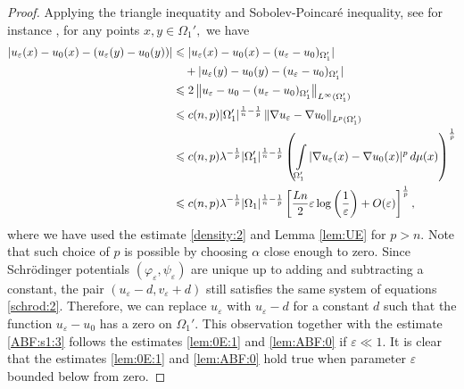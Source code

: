 \documentclass[reqno,12pt]{article}
\newcommand{\norm}[1]{\left\lVert#1\right\rVert}
\newcommand{\I}{\int\limits}
\begin{document}
\begin{proof}
    Applying the triangle inequatity and Sobolev-Poincar\'e inequality, see for instance \cite[Theorem 7.10]{GT77}, for any points $x,y\in \Omega_{1}', $ we have 
\begin{align}
    \label{ABF:s1:3}
    | u_{\varepsilon}(x)-u_0(x)-(u_{\varepsilon}(y)-u_{0}(y))|
    &\leqslant
    |u_{\varepsilon}(x)-u_0(x)-(u_{\varepsilon}-u_{0})_{\Omega_{1}'}| 
    \notag\\&\quad 
    + |u_{\varepsilon}(y)-u_{0}(y)-(u_{\varepsilon}-u_{0})_{\Omega_{1}'}|
    \notag\\
    &\leqslant
    2\norm{u_{\varepsilon}-u_{0}-(u_{\varepsilon}-u_{0})_{\Omega_{1}'}}_{L^{\infty}(\Omega_{1}')} 
    \notag\\
    &\leqslant 
    c(n,p) |\Omega_{1}'|^{\frac{1}{n}-\frac{1}{p}}\norm{\nabla u_{\varepsilon}-\nabla u_{0}}_{L^{p}(\Omega_{1}')}
    \notag \\&
    \leqslant
    c(n,p)\lambda^{-\frac{1}{p}} |\Omega_{1}'|^{\frac{1}{n}-\frac{1}{p}} \left(\I_{\Omega_{1}'} |\nabla u_{\varepsilon}(x)-\nabla u_{0}(x)|^{p}\,d\mu(x) \right)^{\frac{1}{p}}
    \notag \\&
    \leqslant
    c(n,p) \lambda^{-\frac{1}{p}} |\Omega_{1}|^{\frac{1}{n}-\frac{1}{p}} 
    \left[ \frac{Ln}{2}\varepsilon\log\left(\frac{1}{\varepsilon}\right) + O(\varepsilon) \right]^{\frac{1}{p}},
\end{align}
where we have used the estimate \eqref{density:2} and Lemma \ref{lem:UE} for $p>n$. Note that such choice of $p$ is possible by choosing $\alpha$ close enough to zero. Since Schr\"odinger potentials $(\varphi_{\varepsilon}, \psi_{\varepsilon})$ are unique up to adding and subtracting a constant, the pair $(u_{\varepsilon}-d, v_{\varepsilon}+d)$ still satisfies the same system of equations \eqref{schrod:2}. Therefore, we can replace $u_{\varepsilon}$ with $u_{\varepsilon}-d$ for a constant $d$ such that the function $u_{\varepsilon}-u_0$ has a zero on $\Omega_{1}'$. This observation together with the estimate \eqref{ABF:s1:3} follows the estimates \eqref{lem:0E:1} and \eqref{lem:ABF:0} if $\varepsilon \ll 1$. It is clear that the estimates \eqref{lem:0E:1} and \eqref{lem:ABF:0} hold true when parameter $\varepsilon$ bounded below from zero. 


\end{proof}
\end{document}
